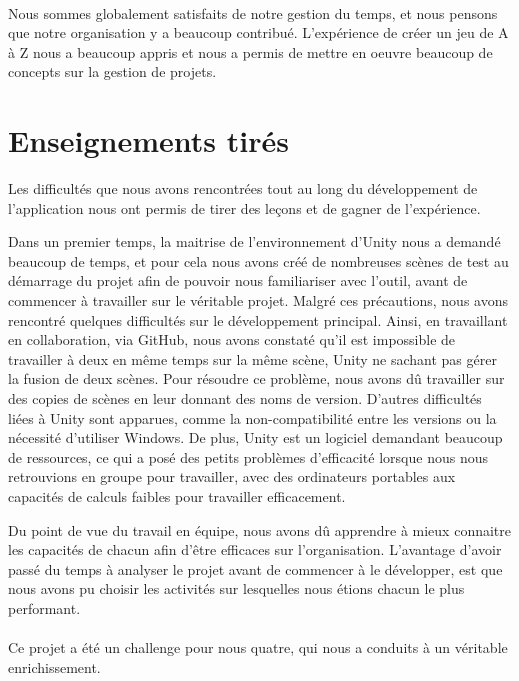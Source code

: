 \paragraph{}
Nous sommes globalement satisfaits de notre gestion du temps, et nous pensons que notre organisation y a beaucoup contribué.
L'expérience de créer un jeu de A à Z nous a beaucoup appris et nous a permis de mettre en oeuvre beaucoup de concepts sur la gestion de projets.

\section{Enseignements tirés}
Les difficultés que nous avons rencontrées tout au long du développement de l'application nous ont permis de tirer des leçons et de gagner de l'expérience.

Dans un premier temps, la maitrise de l'environnement d'Unity nous a demandé beaucoup de temps, et pour cela nous avons créé de nombreuses scènes de test au démarrage du projet afin de pouvoir nous familiariser avec l'outil, avant de commencer à travailler sur le véritable projet. Malgré ces précautions, nous avons rencontré quelques difficultés sur le développement principal. Ainsi, en travaillant en collaboration, via GitHub, nous avons constaté qu'il est impossible de travailler à deux en même temps sur la même scène, Unity ne sachant pas gérer la fusion de deux scènes. Pour résoudre ce problème, nous avons dû travailler sur des copies de scènes en leur donnant des noms de version. D'autres difficultés liées à Unity sont apparues, comme la non-compatibilité entre les versions ou la nécessité d'utiliser Windows. De plus, Unity est un logiciel demandant beaucoup de ressources, ce qui a posé des petits problèmes d'efficacité lorsque nous nous retrouvions en groupe pour travailler, avec des ordinateurs portables aux capacités de calculs faibles pour travailler efficacement.

Du point de vue du travail en équipe, nous avons dû apprendre à mieux connaitre les capacités de chacun afin d'être efficaces sur l'organisation. L'avantage d'avoir passé du temps à analyser le projet avant de commencer à le développer, est que nous avons pu choisir les activités sur lesquelles nous étions chacun le plus performant.

\paragraph{}
Ce projet a été un challenge pour nous quatre, qui nous a conduits à un véritable enrichissement.


